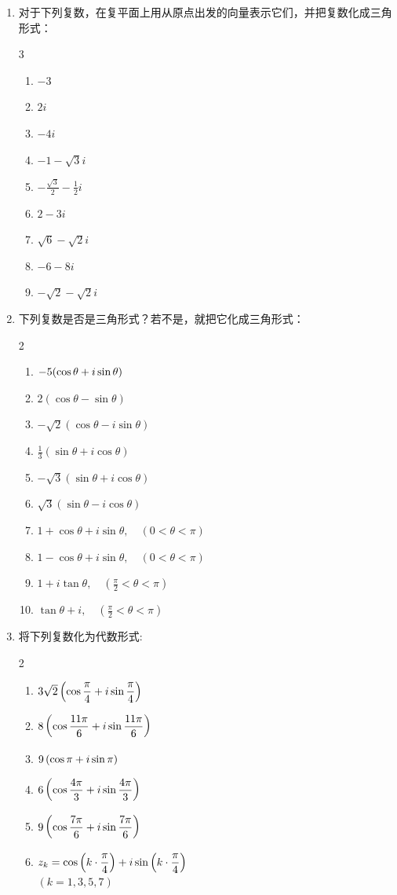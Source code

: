 \begin{enumerate}
    \item 对于下列复数，在复平面上用从原点出发的向量表示它们，并把复数化成三角形式：
\begin{multicols}{3}
\begin{enumerate}[(1)]
    \item $-3$
    \item $2i$
    \item $-4i$
    \item $-1-\sqrt{3}i$
    \item $-\frac{\sqrt{3}}{2}-\frac{1}{2}i$
    \item $2-3i$
    \item $\sqrt{6}-\sqrt{2}i$
    \item $-6-8i$
    \item $-\sqrt{2}-\sqrt{2}i$
\end{enumerate}
\end{multicols}
    \item 下列复数是否是三角形式？若不是，就把它化成三角形式：
\begin{multicols}{2}
\begin{enumerate}[(1)]
    \item $-5(\cos\theta+i\sin\theta)$
    \item $2(\cos\theta-\sin\theta)$
    \item $-\sqrt{2}(\cos\theta-i\sin\theta)$
    \item $\frac{1}{3}(\sin\theta+i\cos\theta)$
    \item $-\sqrt{3}(\sin\theta+i\cos\theta)$
    \item $\sqrt{3}(\sin\theta-i\cos\theta)$
    \item $1+\cos\theta+i\sin\theta,\quad (0<\theta<\pi)$
    \item $1-\cos\theta+i\sin\theta,\quad (0<\theta<\pi)$
    \item $1+i\tan\theta,\quad \left(\frac{\pi}{2}<\theta<\pi\right)$
    \item $\tan\theta+i,\quad \left(\frac{\pi}{2}<\theta<\pi\right)$
\end{enumerate}
\end{multicols}

\item 将下列复数化为代数形式:
\begin{multicols}{2}
\begin{enumerate}[(1)]
    \item $3\sqrt{2}\left(\cos\dfrac{\pi}{4}+i\sin\dfrac{\pi}{4}\right)$
    \item $8\left(\cos\dfrac{11\pi}{6}+i\sin\dfrac{11\pi}{6}\right)$
    \item $9\left(\cos\pi+i\sin\pi\right)$
    \item $6\left(\cos\dfrac{4\pi}{3}+i\sin\dfrac{4\pi}{3}\right)$
    \item $9\left(\cos\dfrac{7\pi}{6}+i\sin\dfrac{7\pi}{6}\right)$
    \item $z_k= \cos\left(k\cdot \dfrac{\pi}{4}\right)+i\sin\left(k\cdot \dfrac{\pi}{4}\right)$\\
    $(k=1,3,5,7)$
\end{enumerate}
\end{multicols}
\end{enumerate}

